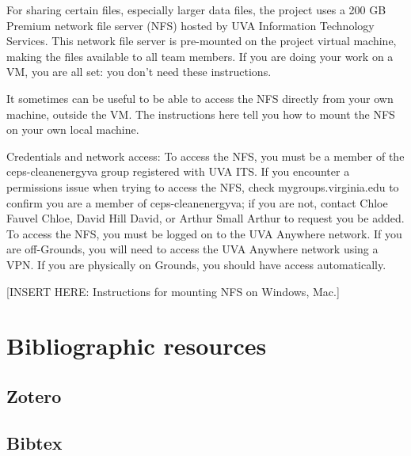 \documentclass[
]{book}
\begin{document}
For sharing certain files, especially larger data files, the project uses a 200 GB Premium network file server (NFS) hosted by UVA Information Technology Services. This network file server is pre-mounted on the project virtual machine, making the files available to all team members. If you are doing your work on a VM, you are all set: you don't need these instructions.

It sometimes can be useful to be able to access the NFS directly from your own machine, outside the VM. The instructions here tell you how to mount the NFS on your own local machine.

Credentials and network access:
To access the NFS, you must be a member of the ceps-cleanenergyva group registered with UVA ITS. If you encounter a permissions issue when trying to access the NFS, check mygroups.virginia.edu to confirm you are a member of ceps-cleanenergyva; if you are not, contact Chloe Fauvel Chloe, David Hill David, or Arthur Small Arthur to request you be added.
To access the NFS, you must be logged on to the UVA Anywhere network. If you are off-Grounds, you will need to access the UVA Anywhere network using a VPN. If you are physically on Grounds, you should have access automatically.

{[}INSERT HERE: Instructions for mounting NFS on Windows, Mac.{]}

\hypertarget{bibliographic-resources}{%
\chapter{Bibliographic resources}\label{bibliographic-resources}}

\hypertarget{zotero}{%
\section{Zotero}\label{zotero}}

\hypertarget{bibtex}{%
\section{Bibtex}\label{bibtex}}

  
\end{document}
